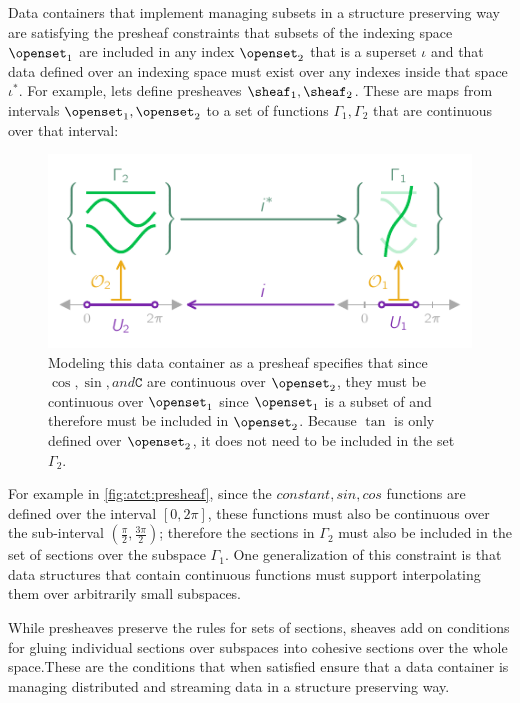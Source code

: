 \documentclass[journal]{IEEEtran}
\theoremstyle{definition}
\theoremstyle{remark}
\begin{document}
Data containers that implement managing subsets in a structure preserving way are satisfying the  presheaf constraints that subsets of the indexing space $\openset_1$ are included in any index $\openset_2$ that is a superset $\iota$ and that data defined over an indexing space must exist over any indexes inside that space $\iota^*$. For example, lets define presheaves $\sheaf_1, \sheaf_2$. These are maps from intervals $\openset_1, \openset_2$ to a set of functions $\Gamma_1, \Gamma_2$ that are continuous over that interval:

\begin{figure}[H]
  \includegraphics*[width=1\columnwidth]{figures/tex/presheaf.pdf}
  \caption{Modeling this data container as a presheaf specifies that since $\cos, \sin, and \texttt{C}$ are continuous over $\openset_{2}$, they must be continuous over $\openset_{1}$ since $\openset_1$ is a subset of and therefore must be included in $\openset_2$. Because $\tan$ is only defined over $\openset_{2}$, it does not need to be included in the set $\Gamma_{2}$. \label{fig:atct:presheaf}}
\end{figure}

For example in \autoref{fig:atct:presheaf}, since the $constant, sin, cos$ functions are defined over the interval $\left[0,2\pi\right]$, these functions must also be continuous over the sub-interval $\left(\frac{\pi}{2}, \frac{3\pi}{2}\right)$; therefore the sections in $\Gamma_{2}$ must also be included in the set of sections over the subspace $\Gamma_{1}$. One generalization of this constraint is that data structures that contain continuous functions must support interpolating them over arbitrarily small subspaces.

While presheaves preserve the rules for sets of sections, sheaves add on conditions for gluing individual sections over subspaces into cohesive sections over the whole space.These are the conditions that when satisfied ensure that a data container is managing distributed and streaming data in a structure preserving way.
\end{document}
